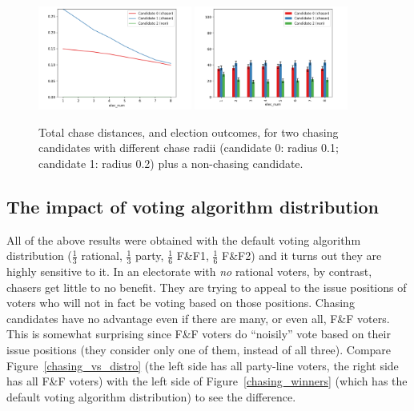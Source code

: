 \begin{figure}[ht]
\centering
\includegraphics[width=0.45\textwidth]{assets/diff_chase_radii_dists.png}
\includegraphics[width=0.45\textwidth]{assets/diff_chase_radii_winners.png}
\caption{Total chase distances, and election outcomes, for two chasing
candidates with different chase radii (candidate 0: radius 0.1; candidate 1:
radius 0.2) plus a non-chasing candidate.}
\label{diff_chase_radius}

\end{figure}


\subsection{The impact of voting algorithm distribution}

All of the above results were obtained with the default voting algorithm
distribution ($\frac{1}{3}$ rational, $\frac{1}{3}$ party, $\frac{1}{6}$ F\&F1,
$\frac{1}{6}$ F\&F2) and it turns out they are highly sensitive to it. In an
electorate with \textit{no} rational voters, by contrast, chasers get little to
no benefit. They are trying to appeal to the issue positions of voters who will
not in fact be voting based on those positions. Chasing candidates have no
advantage even if there are many, or even all, F\&F voters. This is somewhat
surprising since F\&F voters do ``noisily'' vote based on their issue positions
(they consider only one of them, instead of all three). Compare
Figure~\ref{chasing_vs_distro} (the left side has all party-line voters, the
right side has all F\&F voters) with the left side of
Figure~\ref{chasing_winners} (which has the default voting algorithm
distribution) to see the difference.

